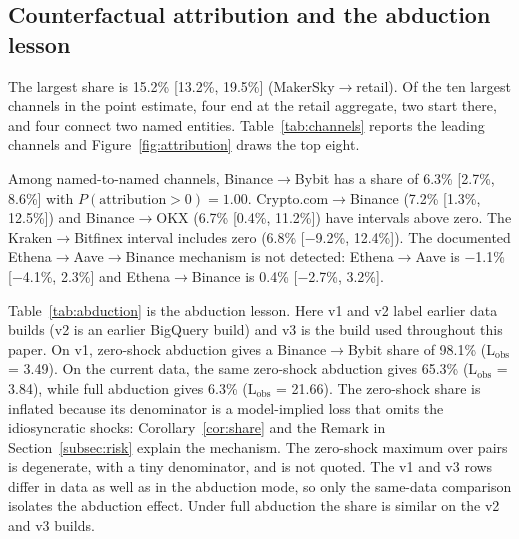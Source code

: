 \documentclass[referee,pdflatex,sn-mathphys-ay]{sn-jnl}
\theoremstyle{thmstyleone}%
\theoremstyle{thmstyletwo}%
\theoremstyle{thmstylethree}%
\begin{document}
\subsection{Counterfactual attribution and the abduction lesson}
\label{subsec:attribution}
The largest share is 15.2\% [13.2\%, 19.5\%] (MakerSky$\to$retail). Of the ten largest channels
in the point estimate, four end at the retail aggregate, two start there, and four connect two named entities.
Table~\ref{tab:channels} reports the leading channels and Figure~\ref{fig:attribution} draws the top eight.

Among named-to-named channels, Binance$\to$Bybit has a share of 6.3\% [2.7\%, 8.6\%] with
$P(\text{attribution}>0)=1.00$. Crypto.com$\to$Binance (7.2\% [1.3\%, 12.5\%]) and
Binance$\to$OKX (6.7\% [0.4\%, 11.2\%]) have intervals above zero. The Kraken$\to$Bitfinex interval includes
zero (6.8\% [$-$9.2\%, 12.4\%]). The documented Ethena$\to$Aave$\to$Binance mechanism is not detected: Ethena$\to$Aave
is $-$1.1\% [$-$4.1\%, 2.3\%] and Ethena$\to$Binance is 0.4\% [$-$2.7\%, 3.2\%].

Table~\ref{tab:abduction} is the abduction lesson. Here v1 and v2 label earlier data builds (v2 is an earlier
BigQuery build) and v3 is the build used throughout this paper. On v1, zero-shock abduction gives a
Binance$\to$Bybit share of 98.1\% (L$_{\text{obs}}$ = 3.49). On the current data, the same
zero-shock abduction gives 65.3\% (L$_{\text{obs}}$ = 3.84), while full abduction gives
6.3\% (L$_{\text{obs}}$ = 21.66). The zero-shock share is inflated because its denominator is a
model-implied loss that omits the idiosyncratic shocks: Corollary~\ref{cor:share} and the Remark in
Section~\ref{subsec:risk} explain the mechanism. The zero-shock maximum over pairs is degenerate, with a tiny
denominator, and is not quoted. The v1 and v3 rows differ in data as well as in the
abduction mode, so only the same-data comparison isolates the abduction effect. Under full abduction the share is similar on the
v2 and v3 builds.
\end{document}
